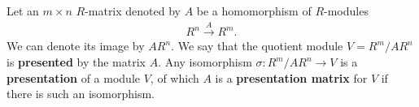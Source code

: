 \documentclass{memoir}
\begin{document}


\begin{defn}[Presentations]
	Let an \(m\times n\) \(R\)-matrix denoted by \(A\) be a homomorphism of \(R\)-modules
	\begin{align*}
		R^{n}\stackrel{A}{\to} R^{m}.
	\end{align*}
	We can denote its image by \(AR^{n}\). We say that the quotient module \(V = R^{m}/ AR^{n}\) is \textbf{presented} by the matrix \(A\). Any isomorphism \(\sigma:R^{m} / AR^{n} \to V\) is a \textbf{presentation} of a module \(V\), of which \(A\) is a \textbf{presentation matrix} for \(V\) if there is such an isomorphism.
\end{defn}
\end{document}
